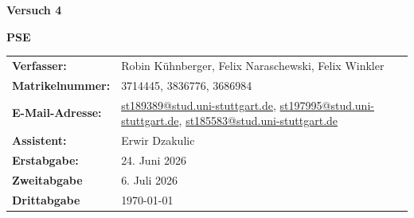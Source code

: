 \documentclass[12pt]{scrartcl} %
\begin{document}
\begin{titlepage}
  \begin{center}
    \vspace*{2cm}
    \begin{LARGE}
      \vspace*{1cm}
      \textbf{\textsf{Versuch 4 \\}}
    \end{LARGE}
    \vspace*{1cm}
    \textbf{\textsf{PSE}}\\
    \vspace*{1.5cm}
    \begin{table}[H]
      \sffamily
      \hspace*{3cm}
      \begin{tabular}{>{\bfseries}p{4cm}p{8cm}}
        Verfasser:      & Robin Kühnberger, Felix Naraschewski, Felix Winkler                                                                                                                                                                                      \\
        Matrikelnummer: & 3714445, 3836776, 3686984                                                                                                                                                                                                                \\
        E-Mail-Adresse: & \href{mailto:st189389@stud.uni-stuttgart.de}{st189389@stud.uni-stuttgart.de}, \href{mailto:st197995@stud.uni-stuttgart.de}{st197995@stud.uni-stuttgart.de}, \href{mailto:st185583@stud.uni-stuttgart.de}{st185583@stud.uni-stuttgart.de} \\
        Assistent:      & Erwir Dzakulic                                                                                                                                                                                                                           \\
        Erstabgabe:     & 24. Juni 2026                                                                                                                                                                                                                            \\
        Zweitabgabe     & 6. Juli 2026                                                                                                                                                                                                                             \\
        Drittabgabe     & \today                                                                                                                                                                                                                                   \\
      \end{tabular}
    \end{table}
  \end{center}
\end{titlepage}
\end{document}
